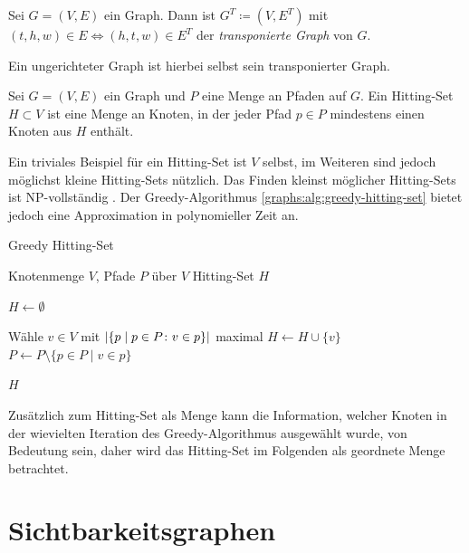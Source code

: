 \begin{definition}
  Sei $G = (V, E)$ ein Graph. Dann ist $G^T \coloneq (V, E^T)$ mit $(t, h, w) \in E \Leftrightarrow (h, t, w) \in E^T$ der \emph{transponierte Graph} von $G$.
\end{definition}

Ein ungerichteter Graph ist hierbei selbst sein transponierter Graph.

\begin{definition}
  Sei $G = (V, E)$ ein Graph und $P$ eine Menge an Pfaden auf $G$.
  Ein Hitting-Set $H \subset V$ ist eine Menge an Knoten, in der jeder Pfad $p \in P$ mindestens einen Knoten aus $H$ enthält.
\end{definition}

Ein triviales Beispiel für ein Hitting-Set ist $V$ selbst, im Weiteren sind jedoch möglichst kleine Hitting-Sets nützlich.
Das Finden kleinst möglicher Hitting-Sets ist NP-vollständig \cite{Kar72}.
Der Greedy-Algorithmus \ref{graphs:alg:greedy-hitting-set} bietet jedoch eine Approximation in polynomieller Zeit an.

\begin{algorithm}
  \caption{Greedy Hitting-Set}
  \begin{algorithmic}[1]
    \Require Knotenmenge $V$, Pfade $P$ über $V$
    \Ensure Hitting-Set $H$

    \State $H \gets \emptyset$

    \State

    \State Wähle $v \in V$ mit $\abs{ \{ p \mid p \in P \colon v \in p \}}$ maximal
    \State $H \gets H \cup \{  v \}$
    \State $P \gets P \setminus \{p \in P \mid v \in p\}$
    \EndWhile

    \State

    \State \Return $H$
  \end{algorithmic}
  \label{graphs:alg:greedy-hitting-set}
\end{algorithm}

Zusätzlich zum Hitting-Set als Menge kann die Information, welcher Knoten in der wievielten Iteration des Greedy-Algorithmus ausgewählt wurde, von Bedeutung sein, daher wird das Hitting-Set im Folgenden als geordnete Menge betrachtet.


\section{Sichtbarkeitsgraphen}

